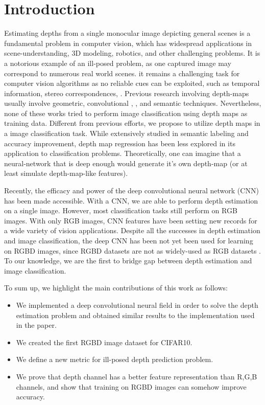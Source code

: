 \documentclass[10pt,twocolumn,letterpaper]{article}
\begin{document}
\section{Introduction}
Estimating depths from a single monocular image depicting 
general scenes is a fundamental problem in computer vision, 
which has widespread applications in scene-understanding, 
3D modeling, robotics, and other challenging problems.
It is a notorious example of an ill-posed problem, 
as one captured image may correspond to numerous real world scenes\cite{eigen2014depth}. 
it remains a challenging task for computer vision algorithms as no reliable cues can be exploited,
such as temporal information, stereo correspondences, \etc.
Previous research involving depth-maps usually involve
geometric\cite{hedau2010thinking,gupta2010estimating,gupta2010blocks}, convolutional\cite{liu2015deep} ,
, and semantic\cite{ladicky2014pulling} techniques.
Nevertheless, none of these works tried to perform image classification using depth maps as training data.
Different from previous efforts, 
we propose to utilize depth maps in a image classification task.
While extensively studied in semantic labeling and accuracy improvement,
depth map regression has been less explored in its application to classification problems. Theoretically, one can imagine that a neural-network that is deep enough would generate it's own depth-map (or at least simulate depth-map-like features).

Recently, the efficacy and power of the deep
convolutional neural network (CNN) has been made accessible. 
With a CNN, we are able to perform depth estimation on a single image\cite{liu2015deep}.
However, most classification tasks still perform on RGB images.
With only RGB images, CNN features have been setting new records for a wide variety of vision applications\cite{razavian2014cnn}.
Despite all the successes in depth estimation and image classification,
the deep CNN has been not yet been used for learning on RGBD images, since RGBD datasets are not as widely-used as RGB datasets .
To our knowledge, we are the first to bridge gap between depth estimation and image classification.

To sum up, we highlight the main contributions of this work as follows:
\begin{itemize}
\vspace{-.12cm} \item 
We implemented a deep convolutional neural field in order to solve the depth estimation problem and obtained similar results to the implementation used in the paper.
\vspace{-.12cm} \item
We created the first RGBD image dataset for CIFAR10.
\vspace{-.12cm} \item 
We define a new metric for ill-posed depth prediction problem.
\vspace{-.12cm} \item 
We prove that depth channel has a better feature representation than R,G,B channels,
and show that training on RGBD images can somehow improve accuracy.
\end{itemize}
\end{document}
